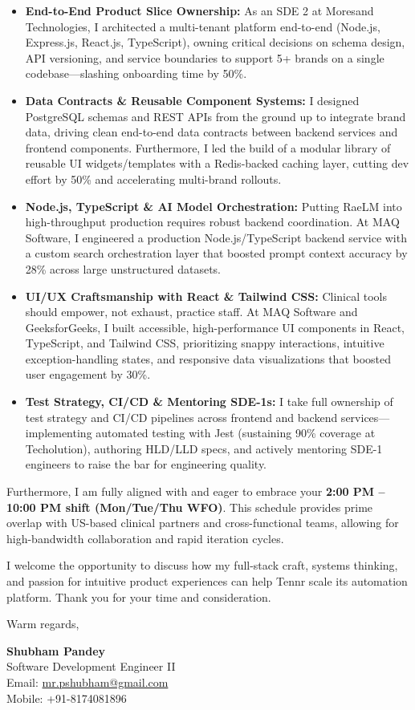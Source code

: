 \documentclass[a4paper,10pt]{article}
\begin{document}
\begin{itemize}[leftmargin=12pt, itemsep=2.5pt, parsep=0pt]
  \item \textbf{End-to-End Product Slice Ownership:} As an SDE 2 at Moresand Technologies, I architected a multi-tenant platform end-to-end (Node.js, Express.js, React.js, TypeScript), owning critical decisions on schema design, API versioning, and service boundaries to support 5+ brands on a single codebase---slashing onboarding time by 50\%.
  \item \textbf{Data Contracts \& Reusable Component Systems:} I designed PostgreSQL schemas and REST APIs from the ground up to integrate brand data, driving clean end-to-end data contracts between backend services and frontend components. Furthermore, I led the build of a modular library of reusable UI widgets/templates with a Redis-backed caching layer, cutting dev effort by 50\% and accelerating multi-brand rollouts.
  \item \textbf{Node.js, TypeScript \& AI Model Orchestration:} Putting RaeLM\texttrademark{} into high-throughput production requires robust backend coordination. At MAQ Software, I engineered a production Node.js/TypeScript backend service with a custom search orchestration layer that boosted prompt context accuracy by 28\% across large unstructured datasets.
  \item \textbf{UI/UX Craftsmanship with React \& Tailwind CSS:} Clinical tools should empower, not exhaust, practice staff. At MAQ Software and GeeksforGeeks, I built accessible, high-performance UI components in React, TypeScript, and Tailwind CSS, prioritizing snappy interactions, intuitive exception-handling states, and responsive data visualizations that boosted user engagement by 30\%.
  \item \textbf{Test Strategy, CI/CD \& Mentoring SDE-1s:} I take full ownership of test strategy and CI/CD pipelines across frontend and backend services---implementing automated testing with Jest (sustaining 90\% coverage at Techolution), authoring HLD/LLD specs, and actively mentoring SDE-1 engineers to raise the bar for engineering quality.
\end{itemize}

\vspace{4pt}
Furthermore, I am fully aligned with and eager to embrace your \textbf{2:00 PM -- 10:00 PM shift (Mon/Tue/Thu WFO)}. This schedule provides prime overlap with US-based clinical partners and cross-functional teams, allowing for high-bandwidth collaboration and rapid iteration cycles.

\vspace{4pt}
I welcome the opportunity to discuss how my full-stack craft, systems thinking, and passion for intuitive product experiences can help Tennr scale its automation platform. Thank you for your time and consideration.

\vspace{8pt}
Warm regards,

\vspace{4pt}
\textbf{Shubham Pandey} \\
Software Development Engineer II \\
Email: \href{mailto:mr.pshubham@gmail.com}{mr.pshubham@gmail.com} \\
Mobile: +91-8174081896
\end{document}
